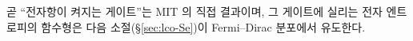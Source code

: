 곧 ``전자항이 켜지는 게이트''는 MIT 의 직접 결과이며, 그 게이트에 실리는 전자 엔트로피의 함수형은 다음
소절(\S\ref{sec:lco-Se})이 Fermi--Dirac 분포에서 유도한다.
